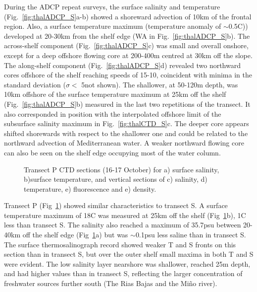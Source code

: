 During the ADCP repeat surveys, the surface salinity and
temperature (Fig.~\ref{fig:thalADCP_S}a-b) showed a shoreward
advection of 10km of the frontal region. Also, a surface
temperature maximum (temperature anomaly of $\sim$0.5\deg C))
developed at 20-30km from the shelf edge (WA in
Fig.~\ref{fig:thalADCP_S}b). The across-shelf component
(Fig.~\ref{fig:thalADCP_S}c) was small and overall onshore, except
for a deep offshore flowing core at 200-400m centred  at 30km off
the slope. The along-shelf component (Fig.~\ref{fig:thalADCP_S}d)
revealed two northward cores offshore of the shelf reaching speeds
of 15-10\velc, coincident with minima in the standard deviation
($\sigma <$ 5\velc not shown). The shallower, at 50-120m depth,
was 10km offshore of the surface temperature maximum at 25km off
the shelf (Fig.~\ref{fig:thalADCP_S}b) measured in the last two
repetitions of the transect. It also corresponded in position with
the interpolated offshore limit of the subsurface salinity maximum
in Fig.~\ref{fig:thalCTD_S}c. The deeper core appears shifted
shorewards with respect to the shallower one and could be related
to the northward advection of Mediterranean water. A weaker
northward flowing core can also be seen on the shelf edge
occupying most of the water column.

\begin{figure}[t]
\arribacap \centering %
\hspace{0.2cm}
\quad%
\subfigure[]{\texttt{[image: P\_S]}}%
\subfigure[]{\texttt{[image: P\_T]}}\quad%
\subfigure[]{\texttt{[image: P\_F]}}%
\subfigure[]{\texttt{[image: P\_D]}}%
\caption{Transect P CTD sections (16-17 October)  for a) surface
salinity, b)surface temperature, and vertical sections of c)
salinity, d) temperature, e) fluorescence and e) density.}
\label{fig:thalCTD_P}
\end{figure}

Transect P (Fig~\ref{fig:thalCTD_P}) showed similar
characteristics to transect S. A surface temperature maximum of
18\deg C was measured at 25km off the shelf
(Fig~\ref{fig:thalCTD_P}b), 1\deg C less than transect S. The
salinity also reached a maximum of 35.7psu between 20-40km off the
shelf edge (Fig~\ref{fig:thalCTD_P}a) but was $\sim$0.1psu less
saline than in transect S. The surface thermosalinograph record
showed weaker T and S fronts on this section than in transect S,
but over the outer shelf small maxima in both T and S were
evident. The low salinity layer nearshore was shallower, reached
25m depth, and had higher values than in transect S, reflecting
the larger concentration of freshwater sources further south (The
Rias Bajas and the Mi\~{n}o river).

